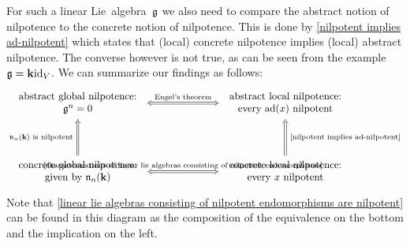 \begin{remark}
  For such a linear Lie~algebra~$\mathfrak{g}$ we also need to compare the abstract notion of nilpotence to the concrete notion of nilpotence.
  This is done by \cref{nilpotent implies ad-nilpotent} which states that (local) concrete nilpotence implies (local) abstract nilpotence.
  The converse however is not true, as can be seen from the example~$\mathfrak{g} = \mathbf{k} {\operatorname{id}_V}$.
  We can summarize our findings as follows:
  \[
    \begin{tikzcd}[column sep = 7em, row sep = huge]
      \begin{tabular}{c}
        abstract global nilpotence: \\
        $\glie^n = 0$
      \end{tabular}
      \arrow[Leftrightarrow]{r}[above]{\text{Engel’s theorem}}
      &
      \begin{tabular}{c}
        abstract local nilpotence:  \\
        every~$\ad(x)$ nilpotent
      \end{tabular}
      \\
      \begin{tabular}{c}
        concrete global nilpotence: \\
        given by~$\nlie_n(\kf)$
      \end{tabular}
      \arrow[Rightarrow]{u}[left]{\text{$\nlie_n(\kf)$ is nilpotent}\;}
      \arrow[Leftrightarrow]{r}[above]{\text{\cref{characterizations of linear lie algebras consisting of nilpotent endomorphisms}}}
      &
      \begin{tabular}{c}
        concrete local nilpotence: \\
        every~$x$ nilpotent
      \end{tabular}
      \arrow[Rightarrow]{u}[right]{\;\text{\cref{nilpotent implies ad-nilpotent}}}
    \end{tikzcd}
  \]
  Note that \cref{linear lie algebras consisting of nilpotent endomorphisms are nilpotent} can be found in this diagram as the composition of the equivalence on the bottom and the implication on the left.
  

\end{remark}
